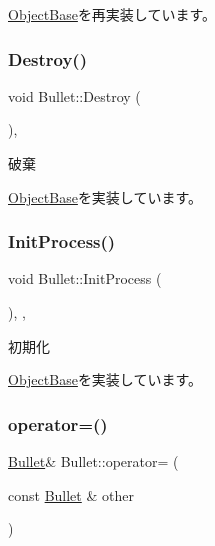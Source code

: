 \mbox{\hyperlink{class_object_base_a3e1db79dfa119be067d816c22d09839d}{Object\+Base}}を再実装しています。

\mbox{\label{class_bullet_a09a92c6b924fb6bc38e18f6c41ac20ff}} 
\subsubsection{\texorpdfstring{Destroy()}{Destroy()}}
{\footnotesize\ttfamily void Bullet\+::\+Destroy (\begin{DoxyParamCaption}{ }\end{DoxyParamCaption})\hspace{0.3cm}{\ttfamily [final]}, {\ttfamily [virtual]}}



破棄 



\mbox{\hyperlink{class_object_base_a7fa4c548153c3af20f89673ffea809af}{Object\+Base}}を実装しています。

\mbox{\label{class_bullet_a448c1c566e002d7b51ba6ed5c927bff7}} 
\subsubsection{\texorpdfstring{Init\+Process()}{InitProcess()}}
{\footnotesize\ttfamily void Bullet\+::\+Init\+Process (\begin{DoxyParamCaption}{ }\end{DoxyParamCaption})\hspace{0.3cm}{\ttfamily [final]}, {\ttfamily [protected]}, {\ttfamily [virtual]}}



初期化 



\mbox{\hyperlink{class_object_base_af133f36f2bca1dcfd962e2cfac61ab51}{Object\+Base}}を実装しています。

\mbox{\label{class_bullet_a2a98443028be8389c0eb9da9a09f661c}} 
\subsubsection{\texorpdfstring{operator=()}{operator=()}}
{\footnotesize\ttfamily \mbox{\hyperlink{class_bullet}{Bullet}}\& Bullet\+::operator= (\begin{DoxyParamCaption}\item[{const \mbox{\hyperlink{class_bullet}{Bullet}} \&}]{other }\end{DoxyParamCaption})\hspace{0.3cm}{\ttfamily [inline]}}




